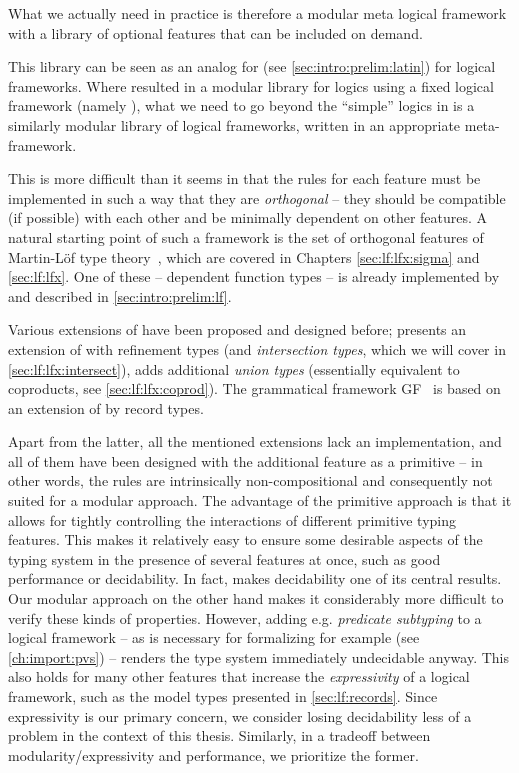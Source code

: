 What we actually need in practice is therefore a modular meta logical framework with a library of optional features that can be included on demand.

This library can be seen as an analog for \latin (see \autoref{sec:intro:prelim:latin}) for logical frameworks. Where \latin resulted in a modular library for logics using a fixed logical framework (namely \LF), what we need to go beyond the ``simple'' logics in \latin is a similarly modular library of logical frameworks, written in an appropriate meta-framework.

This is more difficult than it seems in that the rules for each feature must be implemented in such a way that they are \emph{orthogonal} -- they should be compatible (if possible) with each other and be minimally dependent on other features. A natural starting point of such a framework is the set of orthogonal features of Martin-Löf type theory~\cite{Martin-Loef84}, which are covered in Chapters \ref{sec:lf:lfx:sigma} and \ref{sec:lf:lfx}. One of these -- dependent function types -- is already implemented by \LF and described in \autoref{sec:intro:prelim:lf}.\medskip

Various extensions of \LF have been proposed and designed before; \cite{Pfenning93} presents an extension of \LF with refinement types (and \emph{intersection types}, which we will cover in \autoref{sec:lf:lfx:intersect}), \cite{stolze:hal-01534035} adds additional \emph{union types} (essentially equivalent to coproducts, see \autoref{sec:lf:lfx:coprod}). The grammatical framework GF~\cite{Ranta:GF04} is based on an extension of \LF by record types.

Apart from the latter, all the mentioned extensions lack an implementation, and all of them have been designed with the additional feature as a primitive -- in other words, the rules are intrinsically non-compositional and consequently not suited for a modular approach. The advantage of the primitive approach is that it allows for tightly controlling the interactions of different primitive typing features. This makes it relatively easy to ensure some desirable aspects of the typing system in the presence of several features at once, such as good performance or decidability. In fact, \cite{Pfenning93} makes decidability one of its central results. Our modular approach on the other hand makes it considerably more difficult to verify these kinds of properties. However, adding e.g. \emph{predicate subtyping} to a logical framework -- as is necessary for formalizing \pvs for example (see \autoref{ch:import:pvs}) -- renders the type system immediately undecidable anyway. This also holds for many other features that increase the \emph{expressivity} of a logical framework, such as the model types presented in \autoref{sec:lf:records}. Since expressivity is our primary concern, we consider losing decidability less of a problem in the context of this thesis. Similarly, in a tradeoff between modularity/expressivity and performance, we prioritize the former.

